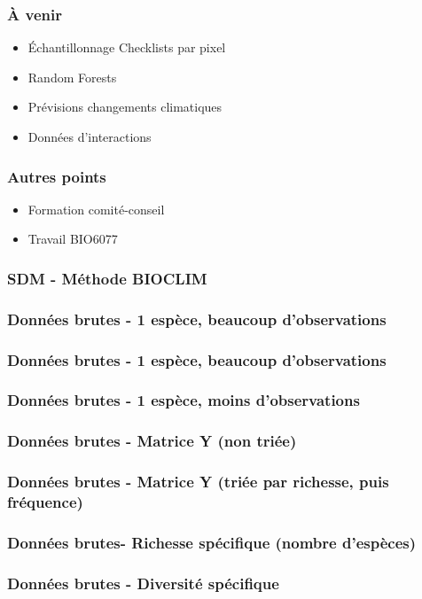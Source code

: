 \documentclass[10pt]{beamer}
\begin{document}
\begin{frame}
  \frametitle{À venir}
  \begin{itemize}
    \item Échantillonnage Checklists par pixel
    \item Random Forests
    \item Prévisions changements climatiques
    \item Données d'interactions
  \end{itemize}
\end{frame}

\begin{frame}
  \frametitle{Autres points}
  \begin{itemize}
    \item Formation comité-conseil
    \item Travail BIO6077
  \end{itemize}
\end{frame}

\begin{frame}
  \frametitle{SDM - Méthode BIOCLIM}
\end{frame}

\begin{frame}
  \frametitle{Données brutes - 1 espèce, beaucoup d'observations}
\end{frame}

\begin{frame}
  \frametitle{Données brutes - 1 espèce, beaucoup d'observations}
\end{frame}

\begin{frame}
  \frametitle{Données brutes - 1 espèce, moins d'observations}
\end{frame}

\begin{frame}
  \frametitle{Données brutes - Matrice Y (non triée)}
\end{frame}

\begin{frame}
  \frametitle{Données brutes - Matrice Y (triée par richesse, puis fréquence)}
\end{frame}

\begin{frame}
  \frametitle{Données brutes- Richesse spécifique (nombre d'espèces)}
\end{frame}

\begin{frame}
  \frametitle{Données brutes - Diversité spécifique}
\end{frame}
\end{document}
